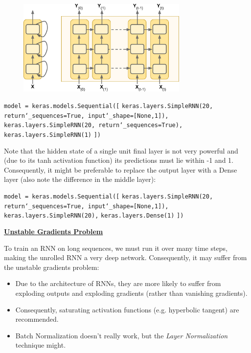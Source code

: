 \begin{figure}[ht]
\centering
\includegraphics[width=0.75\textwidth]{./images/deep_RNN.png}
\end{figure}

\vspace{+4.0mm}
\texttt{model = keras.models.Sequential([}\newline
\texttt{keras.layers.SimpleRNN(20, return\char`_sequences=True, input\char`_shape=[None,1]),}\newline
\texttt{keras.layers.SimpleRNN(20, return\char`_sequences=True),}\newline
\texttt{keras.layers.SimpleRNN(1)}\newline
\texttt{])}

Note that the hidden state of a single unit final layer is not very powerful
and (due to its tanh activation function) its predictions must lie within -1 and 1. 
Consequently, it might be preferable to replace the output layer with a Dense layer
(also note the difference in the middle layer):

\texttt{model = keras.models.Sequential([}\newline
\texttt{keras.layers.SimpleRNN(20, return\char`_sequences=True, input\char`_shape=[None,1]),}\newline
\texttt{keras.layers.SimpleRNN(20),}\newline
\texttt{keras.layers.Dense(1)}\newline
\texttt{])}


\textbf{\underline{Unstable Gradients Problem}}

To train an RNN on long sequences, we must run it over many time steps, making the unrolled RNN a very deep network.    
Consequently, it may suffer from the unstable gradients problem:

\vspace{-3.5mm}
\begin{itemize}
\item
Due to the architecture of RNNs, they are more likely to suffer from exploding outputs and exploding gradients (rather than vanishing gradients).
\item
\vspace{-2.0mm}
Consequently, saturating activation functions (e.g. hyperbolic tangent) are recommended.
\item
\vspace{-2.0mm}
Batch Normalization doesn't really work, but the \textit{Layer Normalization} technique might.
\end{itemize}


